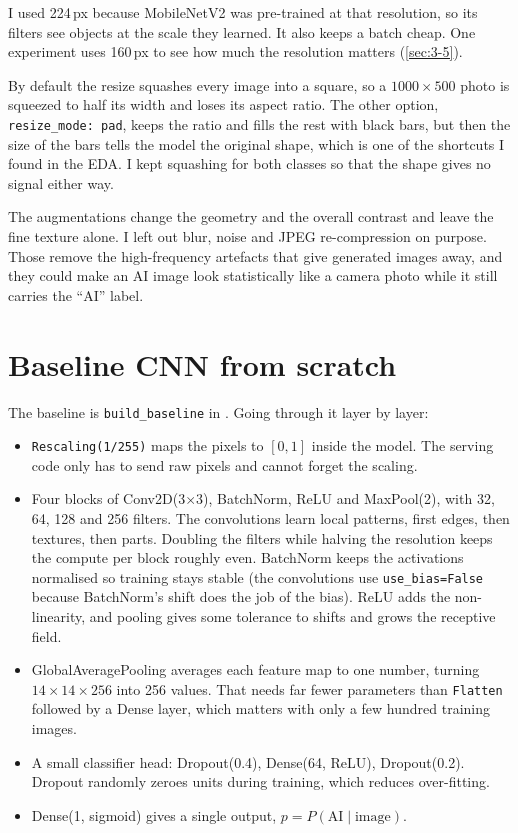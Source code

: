 I used 224\,px because MobileNetV2 was pre-trained at that resolution, so its filters see objects
at the scale they learned. It also keeps a batch cheap. One experiment uses 160\,px to see how
much the resolution matters (\cref{sec:3-5}).

By default the resize squashes every image into a square, so a $1000\times500$ photo is squeezed
to half its width and loses its aspect ratio. The other option, \texttt{resize\_mode: pad}, keeps
the ratio and fills the rest with black bars, but then the size of the bars tells the model the
original shape, which is one of the shortcuts I found in the EDA. I kept squashing for both
classes so that the shape gives no signal either way.

The augmentations change the geometry and the overall contrast and leave the fine texture alone. I
left out blur, noise and JPEG re-compression on purpose. Those remove the high-frequency artefacts
that give generated images away, and they could make an AI image look statistically like a camera
photo while it still carries the ``AI'' label.


\section{Baseline CNN from scratch}
The baseline is \texttt{build\_baseline} in . Going through it layer by layer:
\begin{itemize}
\item \texttt{Rescaling(1/255)} maps the pixels to $[0,1]$ inside the model. The serving code only
has to send raw pixels and cannot forget the scaling.
\item Four blocks of Conv2D(3$\times$3), BatchNorm, ReLU and MaxPool(2), with 32, 64, 128 and 256
filters. The convolutions learn local patterns, first edges, then textures, then parts. Doubling
the filters while halving the resolution keeps the compute per block roughly even. BatchNorm keeps
the activations normalised so training stays stable (the convolutions use \texttt{use\_bias=False}
because BatchNorm's shift does the job of the bias). ReLU adds the non-linearity, and pooling gives
some tolerance to shifts and grows the receptive field.
\item GlobalAveragePooling averages each feature map to one number, turning
$14\times14\times256$ into 256 values. That needs far fewer parameters than \texttt{Flatten}
followed by a Dense layer, which matters with only a few hundred training images.
\item A small classifier head: Dropout(0.4), Dense(64, ReLU), Dropout(0.2). Dropout randomly zeroes
units during training, which reduces over-fitting.
\item Dense(1, sigmoid) gives a single output, $p = P(\text{AI}\mid\text{image})$.
\end{itemize}

